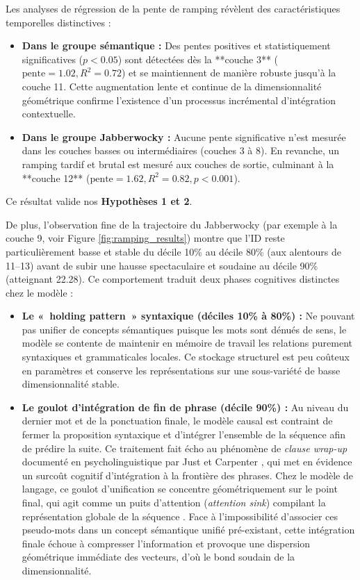 Les analyses de régression de la pente de ramping révèlent des caractéristiques temporelles distinctives :
\begin{itemize}
    \item \textbf{Dans le groupe sémantique : } Des pentes positives et statistiquement significatives ($p < 0.05$) sont détectées dès la **couche 3** ($\text{pente} = 1.02, R^2 = 0.72$) et se maintiennent de manière robuste jusqu'à la couche 11. Cette augmentation lente et continue de la dimensionnalité géométrique confirme l'existence d'un processus incrémental d'intégration contextuelle.
    \item \textbf{Dans le groupe Jabberwocky : } Aucune pente significative n'est mesurée dans les couches basses ou intermédiaires (couches 3 à 8). En revanche, un ramping tardif et brutal est mesuré aux couches de sortie, culminant à la **couche 12** ($\text{pente} = 1.62, R^2 = 0.82, p < 0.001$).
\end{itemize}

Ce résultat valide nos \textbf{Hypothèses 1 et 2}. 

De plus, l'observation fine de la trajectoire du Jabberwocky (par exemple à la couche 9, voir Figure \ref{fig:ramping_results}) montre que l'ID reste particulièrement basse et stable du décile 10\% au décile 80\% (aux alentours de 11--13) avant de subir une hausse spectaculaire et soudaine au décile 90\% (atteignant 22.28). Ce comportement traduit deux phases cognitives distinctes chez le modèle :
\begin{itemize}
    \item \textbf{Le «~holding pattern~» syntaxique (déciles 10\% à 80\%) :} Ne pouvant pas unifier de concepts sémantiques puisque les mots sont dénués de sens, le modèle se contente de maintenir en mémoire de travail les relations purement syntaxiques et grammaticales locales. Ce stockage structurel est peu coûteux en paramètres et conserve les représentations sur une sous-variété de basse dimensionnalité stable.
    \item \textbf{Le goulot d'intégration de fin de phrase (décile 90\%) :} Au niveau du dernier mot et de la ponctuation finale, le modèle causal est contraint de fermer la proposition syntaxique et d'intégrer l'ensemble de la séquence afin de prédire la suite. Ce traitement fait écho au phénomène de \textit{clause wrap-up} documenté en psycholinguistique par Just et Carpenter \cite{just1980theory}, qui met en évidence un surcoût cognitif d'intégration à la frontière des phrases. Chez le modèle de langage, ce goulot d'unification se concentre géométriquement sur le point final, qui agit comme un puits d'attention (\textit{attention sink}) compilant la représentation globale de la séquence \cite{clark2019what}. Face à l'impossibilité d'associer ces pseudo-mots dans un concept sémantique unifié pré-existant, cette intégration finale échoue à compresser l'information et provoque une dispersion géométrique immédiate des vecteurs, d'où le bond soudain de la dimensionnalité.
\end{itemize}

